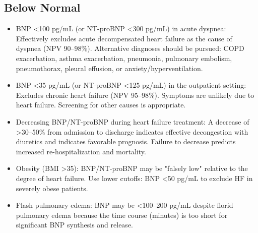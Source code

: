 \subsection*{Below Normal}
\begin{itemize}
  \item BNP <100 pg/mL (or NT-proBNP <300 pg/mL) in acute dyspnea: Effectively excludes acute decompensated heart failure as the cause of dyspnea (NPV 90--98\%). Alternative diagnoses should be pursued: COPD exacerbation, asthma exacerbation, pneumonia, pulmonary embolism, pneumothorax, pleural effusion, or anxiety/hyperventilation.
  \item BNP <35 pg/mL (or NT-proBNP <125 pg/mL) in the outpatient setting: Excludes chronic heart failure (NPV 95--98\%). Symptoms are unlikely due to heart failure. Screening for other causes is appropriate.
  \item Decreasing BNP/NT-proBNP during heart failure treatment: A decrease of >30--50\% from admission to discharge indicates effective decongestion with diuretics and indicates favorable prognosis. Failure to decrease predicts increased re-hospitalization and mortality.
  \item Obesity (BMI >35): BNP/NT-proBNP may be "falsely low" relative to the degree of heart failure. Use lower cutoffs: BNP <50 pg/mL to exclude HF in severely obese patients.
  \item Flash pulmonary edema: BNP may be <100--200 pg/mL despite florid pulmonary edema because the time course (minutes) is too short for significant BNP synthesis and release.
\end{itemize}

